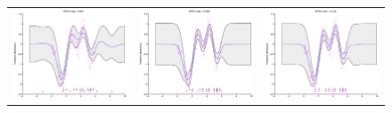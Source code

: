 \documentclass{article} %
\begin{document}
\begin{figure}
\centering
\begin{tabular}{ccc}
\includegraphics[scale=0.3]{figures/func1-svi-lrate1e-03.eps} &
\includegraphics[scale=0.3]{figures/func1-svi-lrate1e-04.eps} &
\includegraphics[scale=0.3]{figures/func1-svi-lrate1e-05.eps} \\

\end{tabular}
\end{figure}
\end{document}
